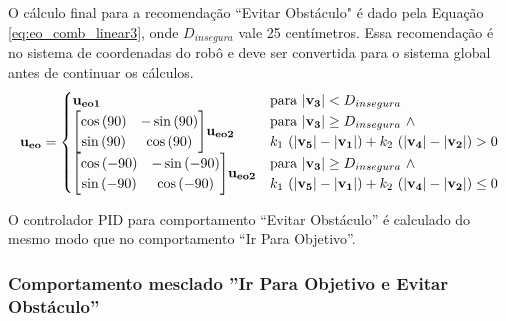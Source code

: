 		O cálculo final para a recomendação ``Evitar Obstáculo" é dado pela Equação 
		\ref{eq:eo_comb_linear3}, onde $D_{insegura}$ vale 25 centímetros. Essa recomendação 
		é no sistema de coordenadas do robô e deve ser convertida para o sistema global antes 
		de continuar os cálculos.
		\begin{equation}
			\label{eq:eo_comb_linear3}
			\mathbf{u_{eo}} = 
			\begin{cases}
				\mathbf{u_{eo1}} & \text{para} \ | \mathbf{v_3} | < D_{insegura} \\
				
				\mleft[
				\begin{matrix}
		  			\cos{(90)} & -\sin{(90)} \\
		  			\sin{(90)} & \cos{(90)} \\
				\end{matrix}
				\mright] \mathbf{u_{eo2}} & 				
				\begin{matrix*}[l]
		  			\text{para} \ | \mathbf{v_3} | \geq D_{insegura} \ \land \\
		  			k_1 \ (|\mathbf{v_5}| - |\mathbf{v_1}|) + k_2 \ (|\mathbf{v_4}| - |\mathbf{v_2}|)
					> 0 \\
				\end{matrix*} \\
				
				\mleft[
				\begin{matrix}
		  			\cos{(-90)} & -\sin{(-90)} \\
		  			\sin{(-90)} & \cos{(-90)} \\
				\end{matrix}
				\mright] \mathbf{u_{eo2}} & 
				\begin{matrix*}[l]
		  			\text{para} \ | \mathbf{v_3} | \geq D_{insegura} \ \land \\
		  			k_1 \ (|\mathbf{v_5}| - |\mathbf{v_1}|) + k_2 \ (|\mathbf{v_4}| - |\mathbf{v_2}|)
					\leq 0 \\
				\end{matrix*} \\
			\end{cases}
		\end{equation}
		
		O controlador PID para comportamento ``Evitar Obstáculo'' é calculado do mesmo modo
		que no comportamento ``Ir Para Objetivo''.
		
		\subsubsection{Comportamento mesclado ''Ir Para Objetivo e Evitar Obstáculo''}
		
